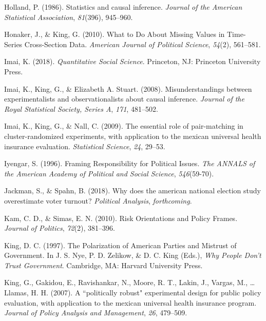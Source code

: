 \documentclass[12pt,econ]{sources/authesis}
\begin{document}
\leavevmode\hypertarget{ref-holland_1986_statistics}{}%
Holland, P. (1986). Statistics and causal inference. \emph{Journal of the American Statistical Association}, \emph{81}(396), 945--960.

\leavevmode\hypertarget{ref-honaker_2010_what}{}%
Honaker, J., \& King, G. (2010). What to Do About Missing Values in Time-Series Cross-Section Data. \emph{American Journal of Political Science}, \emph{54}(2), 561--581.

\leavevmode\hypertarget{ref-imai_quantitative_2018}{}%
Imai, K. (2018). \emph{Quantitative Social Science}. Princeton, NJ: Princeton University Press.

\leavevmode\hypertarget{ref-imai_2008_misunderstandings}{}%
Imai, K., King, G., \& Elizabeth A. Stuart. (2008). Misunderstandings between experimentalists and observationalists about causal inference. \emph{Journal of the Royal Statistical Society, Series A}, \emph{171}, 481--502.

\leavevmode\hypertarget{ref-imai_2009_essential}{}%
Imai, K., King, G., \& Nall, C. (2009). The essential role of pair-matching in cluster-randomized experiments, with application to the mexican universal health insurance evaluation. \emph{Statistical Science}, \emph{24}, 29--53.

\leavevmode\hypertarget{ref-iyengar_framing_1996}{}%
Iyengar, S. (1996). Framing Responsibility for Political Issues. \emph{The ANNALS of the American Academy of Political and Social Science}, \emph{546}(59-70).

\leavevmode\hypertarget{ref-jackman_2018_does}{}%
Jackman, S., \& Spahn, B. (2018). Why does the american national election study overestimate voter turnout? \emph{Political Analysis}, \emph{forthcoming}.

\leavevmode\hypertarget{ref-kam_risk_2010}{}%
Kam, C. D., \& Simas, E. N. (2010). Risk Orientations and Policy Frames. \emph{Journal of Politics}, \emph{72}(2), 381--396.

\leavevmode\hypertarget{ref-king_polarization_1997}{}%
King, D. C. (1997). The Polarization of American Parties and Mistrust of Government. In J. S. Nye, P. D. Zelikow, \& D. C. King (Eds.), \emph{Why People Don't Trust Government}. Cambridge, MA: Harvard University Press.

\leavevmode\hypertarget{ref-king_a-politically_2007}{}%
King, G., Gakidou, E., Ravishankar, N., Moore, R. T., Lakin, J., Vargas, M., \ldots{} Llamas, H. H. (2007). A ``politically robust" experimental design for public policy evaluation, with application to the mexican universal health insurance program. \emph{Journal of Policy Analysis and Management}, \emph{26}, 479--509.
\end{document}
